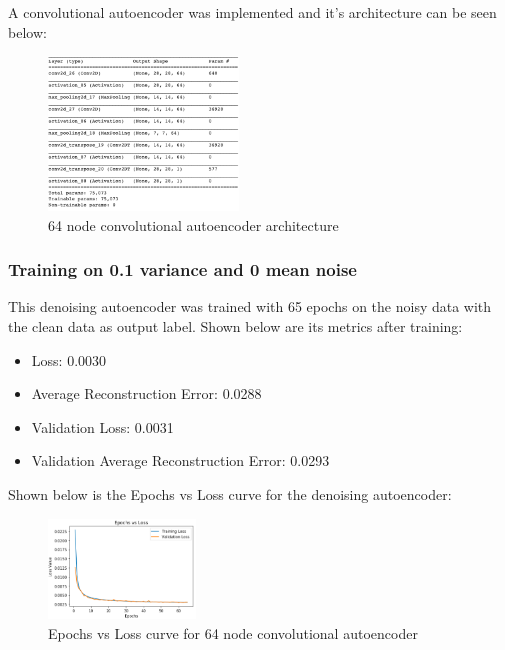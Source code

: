 \documentclass[conference]{IEEEtran}
\begin{document}
    A convolutional autoencoder was implemented and it's architecture can be seen below:

    \begin{figure}[H]
        \centering
        \captionsetup{justification=centering}
        \centering
            \includegraphics[width=0.45\textwidth]{33.png}
            \caption{64 node convolutional autoencoder architecture}
    \end{figure}

    \subsubsection{Training on 0.1 variance and 0 mean noise\\}

    This denoising autoencoder was trained with 65 epochs on the noisy data with the clean data as output label. Shown below
    are its metrics after training:

    \begin{itemize}
        \item Loss: 0.0030
        \item Average Reconstruction Error: 0.0288
        \item Validation Loss: 0.0031
        \item Validation Average Reconstruction Error: 0.0293
    \end{itemize}

    Shown below is the Epochs vs Loss curve for the denoising autoencoder:

    \begin{figure}[H]
        \centering
        \captionsetup{justification=centering}
        \centering
            \includegraphics[width=0.35\textwidth]{34.png}
            \caption{Epochs vs Loss curve for 64 node convolutional autoencoder}
    \end{figure}
\end{document}
